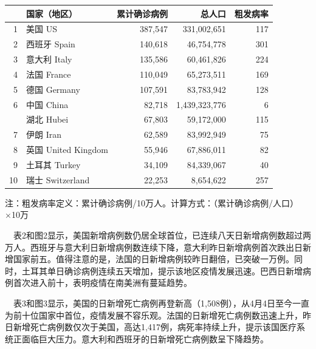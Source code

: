 \documentclass[
]{article}
\begin{document}
\begin{table}[H]
  \vspace{-7mm}
    \caption{累计确诊前十位国家}
      \vspace{-0.5\baselineskip}
      \centering \begin{table}[H]
\centering
\begin{tabular}{rlrrr}
\toprule
  & 国家（地区） & 累计确诊病例 & 总人口 & 粗发病率\\
\midrule
\rowcolor{gray!6}  1 & 美国 US & 387,547 & 331,002,651 & 117\\
2 & 西班牙 Spain & 140,618 & 46,754,778 & 301\\
\rowcolor{gray!6}  3 & 意大利 Italy & 135,586 & 60,461,826 & 224\\
4 & 法国 France & 110,049 & 65,273,511 & 169\\
\rowcolor{gray!6}  5 & 德国 Germany & 107,591 & 83,783,942 & 128\\
6 & 中国 China & 82,718 & 1,439,323,776 & 6\\
\rowcolor{gray!6}   & 湖北 Hubei & 67,803 & 59,172,000 & 115\\
7 & 伊朗 Iran & 62,589 & 83,992,949 & 75\\
\rowcolor{gray!6}  8 & 英国 United Kingdom & 55,946 & 67,886,011 & 82\\
9 & 土耳其 Turkey & 34,109 & 84,339,067 & 40\\
\rowcolor{gray!6}  10 & 瑞士 Switzerland & 22,253 & 8,654,622 & 257\\
\bottomrule
\end{tabular}
\end{table} \begin{tablenotes}
        \footnotesize
        \item 注：粗发病率定义：累计确诊病例/10万人。计算方式：（累计确诊病例/人口）×10万  %
      \end{tablenotes}
    \end{table}

\newpage

\(\quad\)表2和图2显示，美国新增病例数仍居全球首位，已连续八天日新增病例数超过两万人。西班牙与意大利日新增病例数连续下降，意大利昨日新增病例首次跌出日新增国家前五。值得注意的是，法国的日新增病例较昨日翻倍，已突破一万例。同时，土耳其单日确诊病例连续五天增加，提示该地区疫情发展迅速。巴西日新增病例首次进入前十，表明疫情在南美洲有蔓延趋势。

\(\quad\)表3和图3显示，美国的日新增死亡病例再登新高（1,508例），从4月4日至今一直为前十位国家中首位，疫情发展不容乐观。法国的日新增死亡病例数迅速上升，昨日新增死亡病例数仅次于美国，高达1,417例，病死率持续上升，提示该国医疗系统正面临巨大压力。意大利和西班牙的日新增死亡病例数呈下降趋势。
\end{document}
